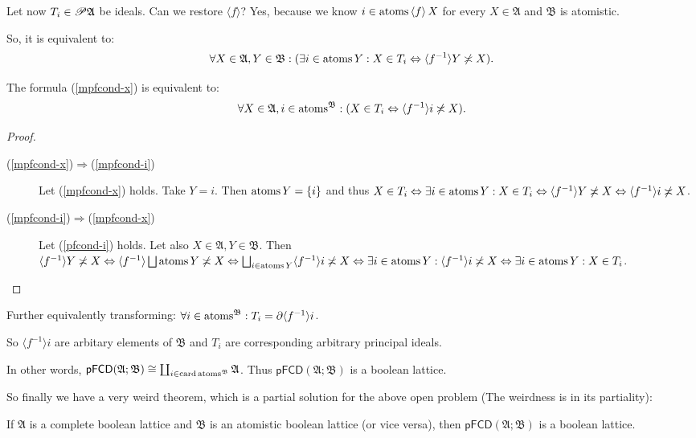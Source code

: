 Let now $T_i \in \mathscr{P} \mathfrak{A}$ be ideals. Can we restore $\langle
f \rangle$? Yes, because we know $i \in \operatorname{atoms} \left\langle f\right\rangle X$ for
every $X \in \mathfrak{A}$ and $\mathfrak{B}$ is atomistic.

So, it is equivalent to:
\begin{equation}
  \label{mpfcond-x} \forall X \in \mathfrak{A}, Y \in \mathfrak{B}: (\exists i
  \in \operatorname{atoms} Y : X \in T_i \Leftrightarrow \langle f^{- 1} \rangle Y
  \not\asymp X) .
\end{equation}
\begin{lem}
  The formula (\ref{mpfcond-x}) is equivalent to:
  \begin{equation}
    \label{mpfcond-i} \forall X \in \mathfrak{A}, i \in
    \operatorname{atoms}^{\mathfrak{B}} : (X \in T_i \Leftrightarrow \langle f^{- 1}
    \rangle i \not\asymp X) .
  \end{equation}
\end{lem}

\begin{proof}
  
  \begin{description}
    \item[(\ref{mpfcond-x})$\Rightarrow$(\ref{mpfcond-i})] Let
    (\ref{mpfcond-x}) holds. Take $Y = i$. Then $\operatorname{atoms} Y = \{ i \}$ and
    thus $X \in T_i \Leftrightarrow \exists i \in \operatorname{atoms} Y : X \in T_i
    \Leftrightarrow \langle f^{- 1} \rangle Y \not\asymp X \Leftrightarrow
    \langle f^{- 1} \rangle i \not\asymp X$.
    
    \item[(\ref{mpfcond-i})$\Rightarrow$(\ref{mpfcond-x})] Let
    (\ref{pfcond-i}) holds. Let also $X \in \mathfrak{A}, Y \in \mathfrak{B}$.
    Then $\langle f^{- 1} \rangle Y \not\asymp X \Leftrightarrow \langle f^{- 1}
    \rangle \bigsqcup \operatorname{atoms} Y \not\asymp X \Leftrightarrow \bigsqcup_{i
    \in \operatorname{atoms} Y} \langle f^{- 1} \rangle i \not\asymp X \Leftrightarrow
    \exists i \in \operatorname{atoms} Y : \langle f^{- 1} \rangle i \not\asymp X
    \Leftrightarrow \exists i \in \operatorname{atoms} Y : X \in T_i$.
  \end{description}
\end{proof}

Further equivalently transforming: $\forall i \in \operatorname{atoms}^{\mathfrak{B}}
: T_i = \partial \langle f^{- 1} \rangle i$.

So $\langle f^{- 1} \rangle i$ are arbitary elements of $\mathfrak{B}$ and
$T_i$ are corresponding arbitrary principal ideals.

In other words, $\mathsf{pFCD} (\mathfrak{A}; \mathfrak{B}) \cong \coprod_{i \in
\operatorname{card} \operatorname{atoms}^{\mathfrak{B}}} \mathfrak{A}$. Thus $\mathsf{pFCD}
(\mathfrak{A}; \mathfrak{B})$ is a boolean lattice.

So finally we have a very weird theorem, which is a partial solution for the
above open problem (The weirdness is in its partiality):

\begin{thm}
  If $\mathfrak{A}$ is a complete boolean lattice and $\mathfrak{B}$ is an
  atomistic boolean lattice (or vice versa), then $\mathsf{pFCD} (\mathfrak{A};
  \mathfrak{B})$ is a boolean lattice.
\end{thm}